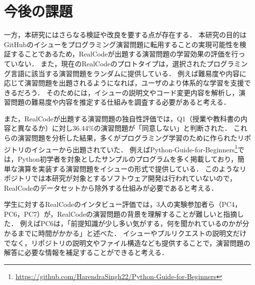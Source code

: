 

\section{今後の課題}
一方，本研究にはさらなる検証や改良を要する点が存在する．
本研究の目的はGitHubのイシューをプログラミング演習問題に転用することの実現可能性を検証することであるため，RealCodeが出題する演習問題の学習効果の評価を行っていない．
また，現在のRealCodeのプロトタイプは，選択されたプログラミング言語に該当する演習問題をランダムに提供している．
例えば難易度や内容に応じて演習問題を出題されるようになれば，ユーザのより体系的な学習を支援できるだろう．
そのためには，イシューの説明文やコード変更内容を解析し，演習問題の難易度や内容を推定する仕組みを調査する必要があると考える．

また，RealCodeが出題する演習問題の独自性評価では，Q1（授業や教科書の内容と異なるか）に対し36.44\%の演習問題が「同意しない」と判断された．
これらの演習問題を分析した結果，多くがプログラミング学習のために作られたリポジトリのイシューから出題されていた．
例えばPython-Guide-for-Beginners\footnote{\url{https://github.com/HarendraSingh22/Python-Guide-for-Beginners}}では，Python初学者を対象としたサンプルのプログラムを多く掲載しており，簡単な演算を実装する演習問題をイシューの形式で提供している．
このようなリポジトリでは本研究が対象とするソフトウェア開発は行われていないので，RealCodeのデータセットから除外する仕組みが必要であると考える．

学生に対するRealCodeのインタビュー評価では，3人の実験参加者ら（PC4，PC6，PC7）が，RealCodeの演習問題の背景を理解することが難しいと指摘した．
例えばPC6は，「前提知識が少し多い気がする，何を聞かれているのかが分かるまでに時間がかかる」と述べた．
イシューやプルリクエストの説明文だけでなく，リポジトリの説明文やファイル構造なども提供することで，演習問題の解答に必要な情報を補足することができると考える．



